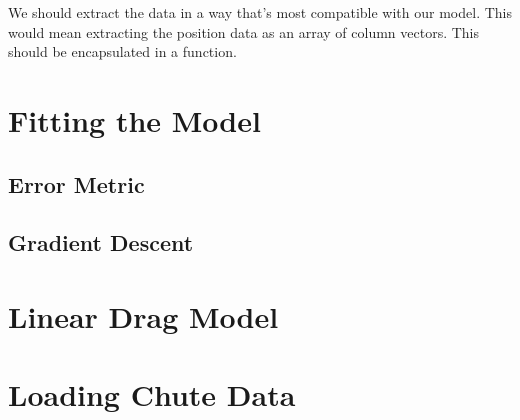 \documentclass[12pt, letterpaper]{article}
\begin{document}
We should extract the data in a way that's most compatible with our model. This would mean extracting the position data as an array of column vectors. This should be encapsulated in a function.

\section{Fitting the Model}
\subsection{Error Metric}
\subsection{Gradient Descent}

\section{Linear Drag Model}
\section{Loading Chute Data}
\end{document}
